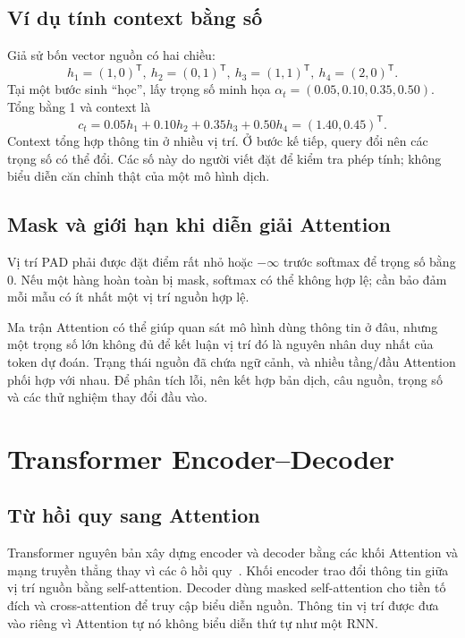 \documentclass[11pt,a4paper]{article}
\numberwithin{equation}{section}
\begin{document}
\subsection{Ví dụ tính context bằng số}
Giả sử bốn vector nguồn có hai chiều:
\begin{equation*}
h_1=(1,0)^{\mathsf T},\ h_2=(0,1)^{\mathsf T},\
h_3=(1,1)^{\mathsf T},\ h_4=(2,0)^{\mathsf T}.
\end{equation*}
Tại một bước sinh ``học'', lấy trọng số minh họa $\alpha_t=(0.05,0.10,0.35,0.50)$. Tổng bằng 1 và context là
\begin{equation*}
c_t=0.05h_1+0.10h_2+0.35h_3+0.50h_4=(1.40,0.45)^{\mathsf T}.
\end{equation*}
Context tổng hợp thông tin ở nhiều vị trí. Ở bước kế tiếp, query đổi nên các trọng số có thể đổi. Các số này do người viết đặt để kiểm tra phép tính; không biểu diễn căn chỉnh thật của một mô hình dịch.

\subsection{Mask và giới hạn khi diễn giải Attention}
Vị trí PAD phải được đặt điểm rất nhỏ hoặc $-\infty$ trước softmax để trọng số bằng 0. Nếu một hàng hoàn toàn bị mask, softmax có thể không hợp lệ; cần bảo đảm mỗi mẫu có ít nhất một vị trí nguồn hợp lệ.

Ma trận Attention có thể giúp quan sát mô hình dùng thông tin ở đâu, nhưng một trọng số lớn không đủ để kết luận vị trí đó là nguyên nhân duy nhất của token dự đoán. Trạng thái nguồn đã chứa ngữ cảnh, và nhiều tầng/đầu Attention phối hợp với nhau. Để phân tích lỗi, nên kết hợp bản dịch, câu nguồn, trọng số và các thử nghiệm thay đổi đầu vào.

\section{Transformer Encoder--Decoder}
\subsection{Từ hồi quy sang Attention}
Transformer nguyên bản xây dựng encoder và decoder bằng các khối Attention và mạng truyền thẳng thay vì các ô hồi quy~\cite{vaswani}. Khối encoder trao đổi thông tin giữa vị trí nguồn bằng self-attention. Decoder dùng masked self-attention cho tiền tố đích và cross-attention để truy cập biểu diễn nguồn. Thông tin vị trí được đưa vào riêng vì Attention tự nó không biểu diễn thứ tự như một RNN.
\end{document}
